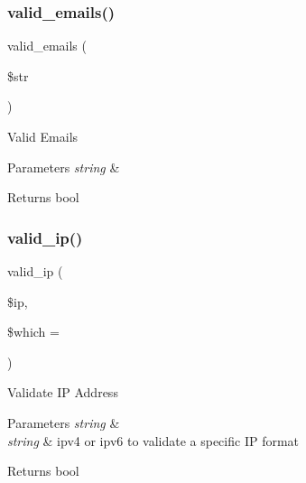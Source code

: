 \subsubsection{\texorpdfstring{valid\+\_\+emails()}{valid\_emails()}}
{\footnotesize\ttfamily valid\+\_\+emails (\begin{DoxyParamCaption}\item[{}]{\$str }\end{DoxyParamCaption})}

Valid Emails


\begin{DoxyParams}{Parameters}
{\em string} & \\
\hline
\end{DoxyParams}
\begin{DoxyReturn}{Returns}
bool 
\end{DoxyReturn}
\mbox{\label{class_c_i___form__validation_a10da42e1fde6cd5b335efcd2338c4ff8}} 
\subsubsection{\texorpdfstring{valid\+\_\+ip()}{valid\_ip()}}
{\footnotesize\ttfamily valid\+\_\+ip (\begin{DoxyParamCaption}\item[{}]{\$ip,  }\item[{}]{\$which = {\ttfamily \textquotesingle{}\textquotesingle{}} }\end{DoxyParamCaption})}

Validate IP Address


\begin{DoxyParams}{Parameters}
{\em string} & \\
\hline
{\em string} & \textquotesingle{}ipv4\textquotesingle{} or \textquotesingle{}ipv6\textquotesingle{} to validate a specific IP format \\
\hline
\end{DoxyParams}
\begin{DoxyReturn}{Returns}
bool 
\end{DoxyReturn}
\mbox{\label{class_c_i___form__validation_aac161b2e5731e6e6e653c960177e5622}} 

